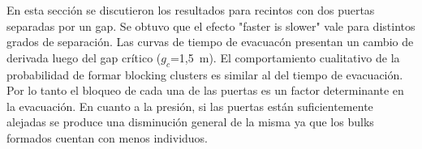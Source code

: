 

En esta sección se discutieron los resultados para recintos con dos puertas separadas por un gap. Se obtuvo que el efecto "faster is slower" vale para distintos grados de separación. Las curvas de tiempo de evacuacón presentan un cambio de derivada  luego del gap crítico ($g_c$=1,5~m). El comportamiento cualitativo de la probabilidad de formar blocking clusters es similar al del tiempo de evacuación. Por lo tanto el bloqueo de cada una de las puertas es un factor determinante en la evacuación. En cuanto a la presión, si las puertas están suficientemente alejadas se produce una disminución general de la misma ya que los bulks formados cuentan con menos individuos. 




